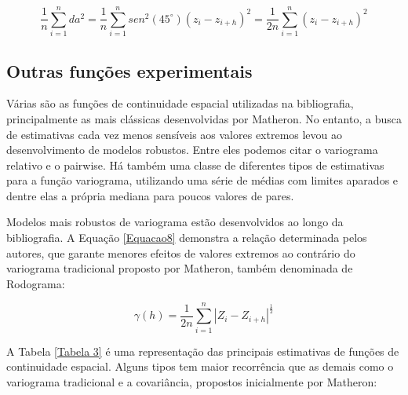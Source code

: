 \begin{equation}\label{Equacao7}
\frac{1}{n} \sum_{i=1}^{n} da^2 =\frac{1}{n} \sum_{i=1}^{n} sen^2(45^\circ)\left( z_i -z_{i+h} \right)^2 = \frac{1}{2n} \sum_{i=1}^{n} \left( z_i -z_{i+h} \right)^2
\end{equation}

\subsection{Outras funções experimentais}

Várias são as funções de continuidade espacial utilizadas na bibliografia, principalmente as mais clássicas desenvolvidas por Matheron. No entanto, a busca de estimativas cada vez menos sensíveis aos valores extremos levou ao desenvolvimento de modelos robustos. Entre eles podemos citar o variograma relativo e o pairwise. Há também uma classe de diferentes tipos de estimativas para a função variograma, utilizando uma série de médias com limites aparados e dentre elas a própria mediana para poucos valores de pares. 

Modelos mais robustos de variograma estão desenvolvidos ao longo da bibliografia. A Equação \ref{Equacao8} demonstra a relação determinada pelos autores, que garante menores efeitos de valores extremos ao contrário do variograma tradicional proposto por Matheron, também denominada de Rodograma: 

\begin{equation}\label{Equacao8}
\gamma(h) = \frac{1}{2n} \sum_{i=1}^{n} \left|  Z_i - Z_{i+h} \right| ^\frac{1}{2}
\end{equation}

A Tabela \ref{Tabela 3} é uma representação das principais estimativas de funções de continuidade espacial. Alguns tipos tem maior recorrência que as demais como o variograma tradicional e a covariância, propostos inicialmente por Matheron:

